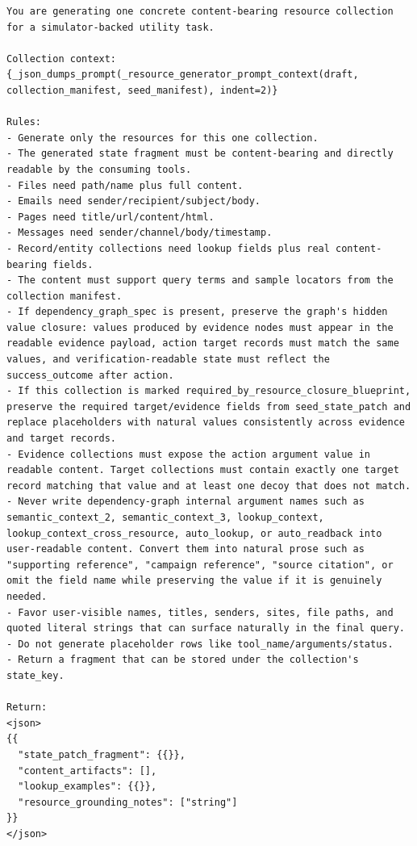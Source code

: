 \begin{tcolorbox}[promptbox,title={Task Planner Prompt}]
\setlength{\parindent}{0pt}
\begin{Verbatim}[breaklines=true, breakanywhere=true, fontsize=\scriptsize, breaksymbolleft={}]
You are generating one concrete content-bearing resource collection for a simulator-backed utility task.

Collection context:
{_json_dumps_prompt(_resource_generator_prompt_context(draft, collection_manifest, seed_manifest), indent=2)}

Rules:
- Generate only the resources for this one collection.
- The generated state fragment must be content-bearing and directly readable by the consuming tools.
- Files need path/name plus full content.
- Emails need sender/recipient/subject/body.
- Pages need title/url/content/html.
- Messages need sender/channel/body/timestamp.
- Record/entity collections need lookup fields plus real content-bearing fields.
- The content must support query terms and sample locators from the collection manifest.
- If dependency_graph_spec is present, preserve the graph's hidden value closure: values produced by evidence nodes must appear in the readable evidence payload, action target records must match the same values, and verification-readable state must reflect the success_outcome after action.
- If this collection is marked required_by_resource_closure_blueprint, preserve the required target/evidence fields from seed_state_patch and replace placeholders with natural values consistently across evidence and target records.
- Evidence collections must expose the action argument value in readable content. Target collections must contain exactly one target record matching that value and at least one decoy that does not match.
- Never write dependency-graph internal argument names such as semantic_context_2, semantic_context_3, lookup_context, lookup_context_cross_resource, auto_lookup, or auto_readback into user-readable content. Convert them into natural prose such as "supporting reference", "campaign reference", "source citation", or omit the field name while preserving the value if it is genuinely needed.
- Favor user-visible names, titles, senders, sites, file paths, and quoted literal strings that can surface naturally in the final query.
- Do not generate placeholder rows like tool_name/arguments/status.
- Return a fragment that can be stored under the collection's state_key.

Return:
<json>
{{
  "state_patch_fragment": {{}},
  "content_artifacts": [],
  "lookup_examples": {{}},
  "resource_grounding_notes": ["string"]
}}
</json>
\end{Verbatim}
\end{tcolorbox}